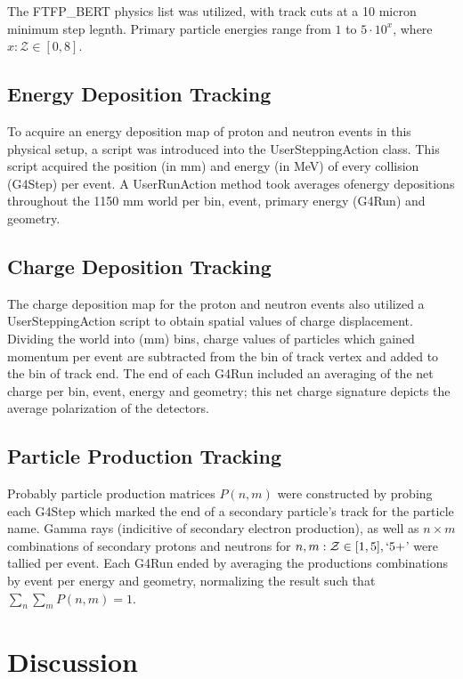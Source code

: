 \documentclass[11pt]{article}
\begin{document}
\begin{multicols}{2}
The FTFP\_BERT physics list was utilized\cite{Geant4:physicsList}, with track cuts at a 10 micron minimum step legnth.  Primary particle energies range from $1$ to $5\cdot10^x$, where $x:\mathcal{Z}\in[0,8]$.

\subsection{Energy Deposition Tracking}

To acquire an energy deposition map of proton and neutron events in this physical setup, a script was introduced into the UserSteppingAction class.  This script acquired the position (in mm) and energy (in MeV) of every collision (G4Step) per event.  A UserRunAction method took averages ofenergy depositions throughout the 1150 mm world per bin, event, primary energy (G4Run) and geometry.

\subsection{Charge Deposition Tracking}

The charge deposition map for the proton and neutron events also utilized a UserSteppingAction script to obtain spatial values of charge displacement.  Dividing the world into (mm) bins, charge values of particles which gained momentum per event are subtracted from the bin of track vertex and added to the bin of track end.  The end of each G4Run included an averaging of the net charge per bin, event, energy and geometry; this net charge signature depicts the average polarization of the detectors.

\subsection{Particle Production Tracking}

Probably particle production matrices $P(n,m)$ were constructed by probing each G4Step which marked the end of a secondary particle's track for the particle name.  Gamma rays (indicitive of secondary electron production), as well as $n\times m$ combinations of secondary protons and neutrons for $n,m:\mathcal{Z}\in[1,5], \lq 5+$' were tallied per event.  Each G4Run ended by averaging the productions combinations by event per energy and geometry, normalizing the result such that $\sum_n \sum_m P(n,m) = 1$.

\section{Discussion}


\end{multicols}
\end{document}
